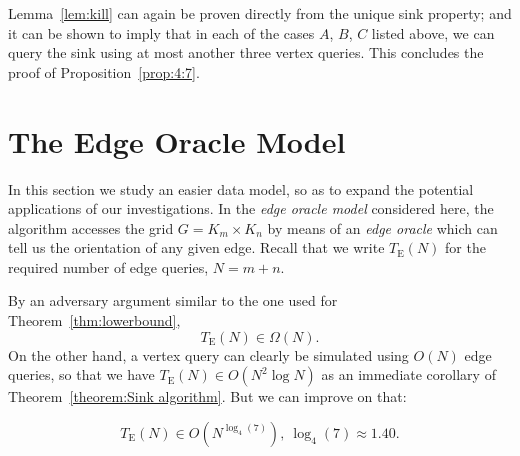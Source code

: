\documentclass[runningheads,a4paper]{llncs}
\newcommand{\timeEdge}{\ensuremath{T_\mathrm{E}}}
\begin{document}
Lemma~\ref{lem:kill} can again be proven directly from the unique sink
property; and it can be shown to imply that in each of the cases $A$, $B$, $C$
listed above, we can query the sink using at most another three vertex
queries. This concludes the proof of Proposition~\ref{prop:4:7}.

\section{The Edge Oracle Model}
\label{section:The edge oracle model}

In this section we study an easier data model, so as to expand the potential
applications of our investigations.
In the \emph{edge oracle model} considered here, the algorithm accesses the
grid $G = K_m \times K_n$ by means of an \emph{edge oracle} which can tell us
the orientation of any given edge.
Recall that we write $\timeEdge(N)$ for the required number of edge queries,
$N = m+n$.

By an adversary argument similar to the one used for Theorem~\ref{thm:lowerbound},
\[
    \timeEdge(N) \in \Omega(N).
\]
On the other hand, a vertex query can clearly be simulated using $O(N)$ edge
queries, so that we have $\timeEdge(N) \in O(N^2 \log N)$ as an immediate
corollary of Theorem~\ref{theorem:Sink algorithm}.
But we can improve on that:

\begin{theorem}
    \label{thm:timeEdge}
    \[
        \timeEdge(N) \in O(N ^ {\log_4(7)}),~ \log_4(7) \approx 1.40.
    \]
\end{theorem}
\end{document}
